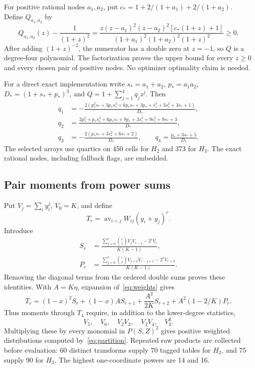 \documentclass[11pt,a4paper]{article}
\theoremstyle{definition}\newtheorem{definition}[theorem]{Definition}
\theoremstyle{remark}\newtheorem{remark}[theorem]{Remark}
\newcommand{\av}{\operatorname{av}}
\numberwithin{equation}{section}
\begin{document}
For positive rational nodes $a_1,a_2$, put $c_*=1+2/(1+a_1)+2/(1+a_2)$. Define $Q_{a_1,a_2}$ by
\begin{equation}\label{eq:quartic}
 Q_{a_1,a_2}(z)-\frac1{(1+z)^2}
 =\frac{z(z-a_1)^2(z-a_2)^2[c_*(1+z)+1]}
 {(1+a_1)^2(1+a_2)^2(1+z)^2}\ge0.
\end{equation}
After adding $(1+z)^{-2}$, the numerator has a double zero at $z=-1$, so $Q$ is a degree-four polynomial. The factorization proves the upper bound for every $z\ge0$ and every chosen pair of positive nodes. No optimizer optimality claim is needed.

For a direct exact implementation write $s_*=a_1+a_2$, $p_*=a_1a_2$, $D_*=(1+s_*+p_*)^3$, and $Q=1+\sum_{j=1}^4q_jz^j$. Then
\begin{align*}
q_1&=-\frac{2(p_*^2s_*+3p_*s_*^2+6p_*s_*+3p_*+s_*^3+3s_*^2+3s_*+1)}{D_*},\\
q_2&=\frac{2p_*^2+p_*s_*^2+6p_*s_*+9p_*+3s_*^3+9s_*^2+9s_*+3}{D_*},\\
q_3&=-\frac{2(p_*s_*+3s_*^2+6s_*+2)}{D_*},\qquad
q_4=\frac{p_*+3s_*+5}{D_*}.
\end{align*}
The selected arrays use quartics on 450 cells for $H_2$ and 373 for $H_3$. The exact rational nodes, including fallback flags, are embedded.

\subsection{Pair moments from power sums}
Put $V_j=\sum_i y_i^j$, $V_0=K$, and define
\[
 T_r=\av_{i<j}W_{ij}(y_i+y_j)^r.
\]
Introduce
\begin{align*}
 S_r&=\frac{\sum_{j=0}^r\binom rj V_jV_{r-j}-2^rV_r}{K(K-1)},\\
 P_r&=\frac{\sum_{j=0}^r\binom rj V_{j+1}V_{r-j+1}-2^rV_{r+2}}{K(K-1)}.
\end{align*}
Removing the diagonal terms from the ordered double sums proves these identities. With $A=K\eta$, expansion of~\eqref{eq:weights} gives
\begin{equation}\label{eq:T}
 T_r=(1-x)^2S_r+(1-x)AS_{r+1}
       +\frac{A^2}{2K}S_{r+2}+A^2(1-2/K)P_r.
\end{equation}
Thus moments through $T_4$ require, in addition to the lower-degree statistics,
\[
 V_5,\quad V_6,\quad V_2V_3,\quad V_2V_4,\quad V_3^2.
\]
Multiplying these by every monomial in $P(S,Z)^2$ gives positive weighted distributions computed by~\eqref{eq:partition}. Repeated raw products are collected before evaluation: 60 distinct transforms supply 70 tagged tables for $H_2$, and 75 supply 90 for $H_3$. The highest one-coordinate powers are 14 and 16.
\end{document}

